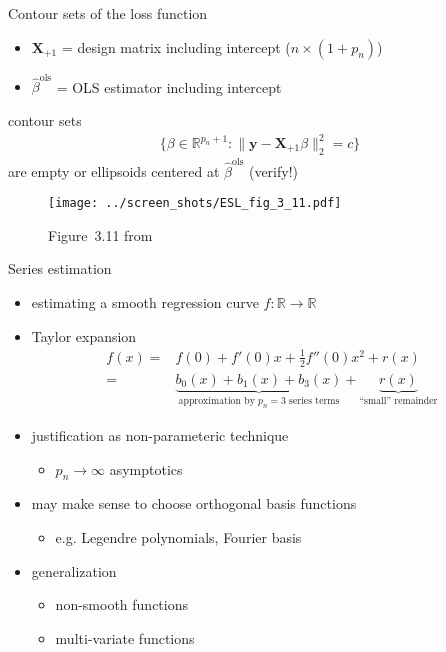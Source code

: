 \documentclass[xcolor=dvipsnames, handout]{beamer}
\begin{document}
\begin{frame}{Contour sets of the loss function}    
\begin{itemize}
  \item 
  $\mathbf{X}_{+1}$ = design matrix including intercept ($n \times (1 + p_n)$)
  \item 
  $\hat{\beta}^{\text{ols}}$ = OLS estimator including intercept
\end{itemize}
contour sets 
\begin{align*}
\big\{
  \beta \in \mathbb{R}^{p_n + 1} : \lVert \mathbf{y} - \mathbf{X}_{+1} \beta \rVert_2^2 = c 
\big\}
\end{align*}
are empty or ellipsoids centered at $\hat{\beta}^{\text{ols}}$ (verify!)
\end{frame}

\begin{frame}
\begin{figure}
  \texttt{[image: ../screen\_shots/ESL\_fig\_3\_11.pdf]}
   \caption{Figure~3.11 from \textcite{hastie2009elements}}
\end{figure}
\end{frame}


\begin{frame}{Series estimation \parencite{newey1997convergence}}
\begin{itemize}
  \item<+-> estimating a smooth regression curve $f: \mathbb{R} \to \mathbb{R}$
  \item<+-> Taylor expansion 
  \begin{align*}
    f(x) =& f(0) + f'(0)x + \frac{1}{2} f''(0) x^2 + r(x)
  \\
    =& \underbrace{b_0(x) + b_1(x) + b_{3}(x)}_{\text{approximation by $p_n = 3$ series terms}} + \underbrace{r(x)}_{\text{``small'' remainder}}
  \end{align*}
  \item<+-> justification as non-parameteric technique
  \begin{itemize}
    \item 
    $p_n \to \infty$ asymptotics
  \end{itemize}
  \item<+-> may make sense to choose orthogonal basis functions
  \begin{itemize}
    \item e.g. Legendre polynomials, Fourier basis
  \end{itemize}
  \item<+-> generalization
  \begin{itemize}
    \item non-smooth functions 
    \item multi-variate functions
  \end{itemize}
\end{itemize}
\end{frame}
\end{document}
